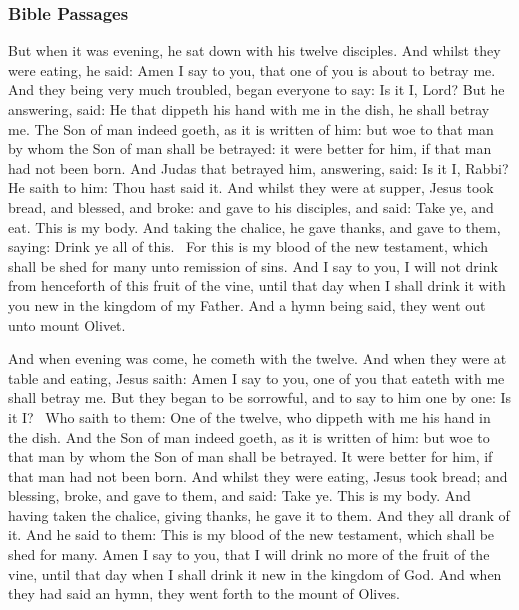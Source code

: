\subsubsection*{Bible Passages}
\begin{multicols}{2}\small
But when it was evening, he sat down with his twelve disciples. And whilst they were eating, he said: Amen I say to you,
that one of you is about to betray me. And they being very much troubled, began everyone to say: Is it I, Lord? But he
answering, said: He that dippeth his hand with me in the dish, he shall betray me. The Son of man indeed goeth, as it
is written of him: but woe to that man by whom the Son of man shall be betrayed: it were better for him, if that man
had not been born. And Judas that betrayed him, answering, said: Is it I, Rabbi? He saith to him: Thou hast said it.
And whilst they were at supper, Jesus took bread, and blessed, and broke: and gave to his disciples, and said: Take ye,
and eat. This is my body. And taking the chalice, he gave thanks, and gave to them, saying: Drink ye all of this.  For
this is my blood of the new testament, which shall be shed for many unto remission of sins. And I say to you, I will
not drink from henceforth of this fruit of the vine, until that day when I shall drink it with you new in the kingdom
of my Father. And a hymn being said, they went out unto mount Olivet. 

And when evening was come, he cometh with the twelve. And when they were at table and eating, Jesus saith: Amen I say to
you, one of you that eateth with me shall betray me. But they began to be sorrowful, and to say to him one by one: Is
it I?  Who saith to them: One of the twelve, who dippeth with me his hand in the dish. And the Son of man indeed goeth,
as it is written of him: but woe to that man by whom the Son of man shall be betrayed. It were better for him, if that
man had not been born. And whilst they were eating, Jesus took bread; and blessing, broke, and gave to them, and said:
Take ye. This is my body. And having taken the chalice, giving thanks, he gave it to them. And they all drank of it.
And he said to them: This is my blood of the new testament, which shall be shed for many. Amen I say to you, that I
will drink no more of the fruit of the vine, until that day when I shall drink it new in the kingdom of God. And when
they had said an hymn, they went forth to the mount of Olives. 


\end{multicols}

